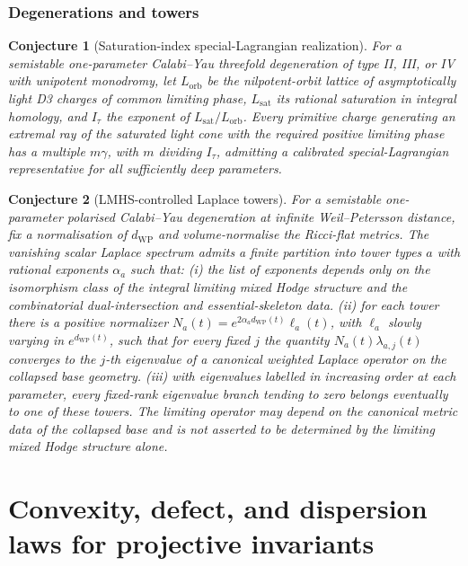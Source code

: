 \documentclass[11pt]{article}
\newtheorem{conjecture}{Conjecture}
\theoremstyle{definition}
\begin{document}
\section{Degenerations and towers}

\begin{conjecture}[Saturation-index special-Lagrangian realization]\label{ad18}
For a semistable one-parameter Calabi--Yau threefold degeneration of type II, III, or IV with unipotent monodromy, let $L_{\mathrm{orb}}$ be the nilpotent-orbit lattice of asymptotically light D3 charges of common limiting phase, $L_{\mathrm{sat}}$ its rational saturation in integral homology, and $I_\tau$ the exponent of $L_{\mathrm{sat}}/L_{\mathrm{orb}}$.  Every primitive charge generating an extremal ray of the saturated light cone with the required positive limiting phase has a multiple $m\gamma$, with $m$ dividing $I_\tau$, admitting a calibrated special-Lagrangian representative for all sufficiently deep parameters.
\end{conjecture}

\begin{conjecture}[LMHS-controlled Laplace towers]\label{ad19}
For a semistable one-parameter polarised Calabi--Yau degeneration at infinite Weil--Petersson distance, fix a normalisation of $d_{\mathrm{WP}}$ and volume-normalise the Ricci-flat metrics.  The vanishing scalar Laplace spectrum admits a finite partition into tower types $a$ with rational exponents $\alpha_a$ such that:
(i) the list of exponents depends only on the isomorphism class of the integral limiting mixed Hodge structure and the combinatorial dual-intersection and essential-skeleton data.
(ii) for each tower there is a positive normalizer $N_a(t)=e^{2\alpha_ad_{\mathrm{WP}}(t)}\ell_a(t)$, with $\ell_a$ slowly varying in $e^{d_{\mathrm{WP}}(t)}$, such that for every fixed $j$ the quantity $N_a(t)\lambda_{a,j}(t)$ converges to the $j$-th eigenvalue of a canonical weighted Laplace operator on the collapsed base geometry.
(iii) with eigenvalues labelled in increasing order at each parameter, every fixed-rank eigenvalue branch tending to zero belongs eventually to one of these towers.
The limiting operator may depend on the canonical metric data of the collapsed base and is not asserted to be determined by the limiting mixed Hodge structure alone.
\end{conjecture}

\part{Convexity, defect, and dispersion laws for projective invariants}
\end{document}
